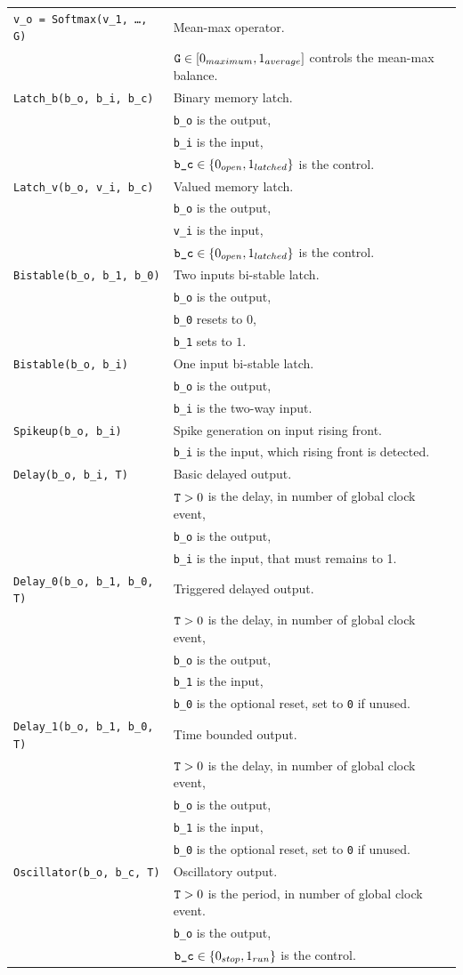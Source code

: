 \documentclass[a4]{article} \usepackage[left=2cm,right=3cm,top=1cm,bottom=2cm]{geometry}
\begin{document}
{\begin{tabular}{ll}
  {\tt v\_o = Softmax(v\_1, …, G)} & Mean-max operator. \\ & $\mbox{{\tt G}} \in [0_{maximum}, 1_{average}]$ controls the mean-max balance.\\
  {\tt Latch\_b(b\_o, b\_i, b\_c)} & Binary memory latch. \\& {\tt b\_o} is the  output, \\& {\tt b\_i} is the input,  \\& $\mbox{{\tt b\_c}} \in \{0_{open}, 1_{latched}\}$ is the control. \\
  {\tt Latch\_v(b\_o, v\_i, b\_c)} & Valued memory latch. \\& {\tt b\_o} is the  output, \\& {\tt v\_i} is the input,  \\& $\mbox{{\tt b\_c}} \in \{0_{open}, 1_{latched}\}$ is the control. \\
  {\tt Bistable(b\_o, b\_1, b\_0)} & Two inputs bi-stable latch. \\& {\tt b\_o} is the  output, \\& {\tt b\_0} resets to $0$, \\& {\tt b\_1} sets to $1$. \\
  {\tt Bistable(b\_o, b\_i)} & One input bi-stable latch. \\& {\tt b\_o} is the  output, \\& {\tt b\_i} is the two-way input.\\
  {\tt Spikeup(b\_o, b\_i)} & Spike generation on input rising front. \\& {\tt b\_i} is the input, which rising front is detected.\\
  {\tt Delay(b\_o, b\_i, T)} & Basic delayed output. \\& $\mbox{{\tt T}} > 0$ is the delay, in number of global clock event, \\& {\tt b\_o} is the  output, \\& {\tt b\_i} is the input, that must  remains to 1.\\
  {\tt Delay\_0(b\_o, b\_1, b\_0, T)} & Triggered delayed output. \\& $\mbox{{\tt T}} > 0$ is the delay, in number of global clock event, \\& {\tt b\_o} is the  output, \\& {\tt b\_1} is the input, \\& {\tt b\_0} is the optional reset, set to {\tt 0} if unused.\\
  {\tt Delay\_1(b\_o, b\_1, b\_0, T)} & Time bounded output. \\& $\mbox{{\tt T}} > 0$ is the delay, in number of global clock event, \\& {\tt b\_o} is the  output, \\& {\tt b\_1} is the input, \\& {\tt b\_0} is the optional reset, set to {\tt 0} if unused.\\
  {\tt Oscillator(b\_o, b\_c, T)} & Oscillatory output. \\& $\mbox{{\tt T}} > 0$ is the period, in number of global clock event. \\& {\tt b\_o} is the  output, \\& $\mbox{{\tt b\_c}} \in \{0_{stop}, 1_{run}\}$ is the control.\\
\end{tabular}}
\end{document}
